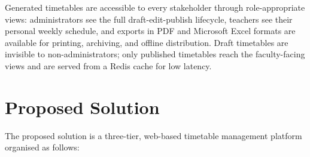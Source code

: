 Generated timetables are accessible to every stakeholder through role-appropriate views: administrators see the full draft-edit-publish lifecycle, teachers see their personal weekly schedule, and exports in PDF and Microsoft Excel formats are available for printing, archiving, and offline distribution. Draft timetables are invisible to non-administrators; only published timetables reach the faculty-facing views and are served from a Redis cache for low latency.

\section{Proposed Solution}

The proposed solution is a three-tier, web-based timetable management platform organised as follows:

